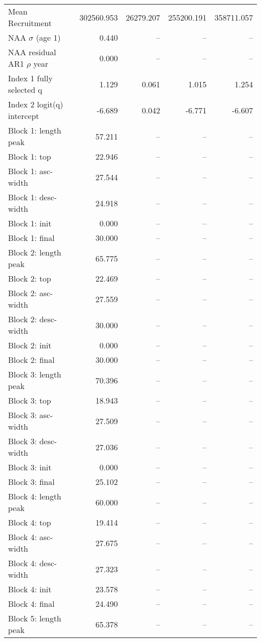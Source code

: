 \documentclass[
]{article}
\begin{document}
\begin{landscape}
\begin{longtable}[t]{lrrrr}
\endfoot
\bottomrule
\endlastfoot
Mean Recruitment & 302560.953 & 26279.207 & 255200.191 & 358711.057\\
NAA $\sigma$ (age 1) & 0.440 & -- & -- & --\\
NAA residual AR1 $\rho$ year & 0.000 & -- & -- & --\\
Index 1 fully selected q & 1.129 & 0.061 & 1.015 & 1.254\\
Index 2 logit(q) intercept & -6.689 & 0.042 & -6.771 & -6.607\\
\addlinespace
Block 1: length peak & 57.211 & -- & -- & --\\
Block 1: top & 22.946 & -- & -- & --\\
Block 1: asc-width & 27.544 & -- & -- & --\\
Block 1: desc-width & 24.918 & -- & -- & --\\
Block 1: init & 0.000 & -- & -- & --\\
\addlinespace
Block 1: final & 30.000 & -- & -- & --\\
Block 2: length peak & 65.775 & -- & -- & --\\
Block 2: top & 22.469 & -- & -- & --\\
Block 2: asc-width & 27.559 & -- & -- & --\\
Block 2: desc-width & 30.000 & -- & -- & --\\
\addlinespace
Block 2: init & 0.000 & -- & -- & --\\
Block 2: final & 30.000 & -- & -- & --\\
Block 3: length peak & 70.396 & -- & -- & --\\
Block 3: top & 18.943 & -- & -- & --\\
Block 3: asc-width & 27.509 & -- & -- & --\\
\addlinespace
Block 3: desc-width & 27.036 & -- & -- & --\\
Block 3: init & 0.000 & -- & -- & --\\
Block 3: final & 25.102 & -- & -- & --\\
Block 4: length peak & 60.000 & -- & -- & --\\
Block 4: top & 19.414 & -- & -- & --\\
\addlinespace
Block 4: asc-width & 27.675 & -- & -- & --\\
Block 4: desc-width & 27.323 & -- & -- & --\\
Block 4: init & 23.578 & -- & -- & --\\
Block 4: final & 24.490 & -- & -- & --\\
Block 5: length peak & 65.378 & -- & -- & --\\

\end{longtable}
\end{landscape}
\end{document}
